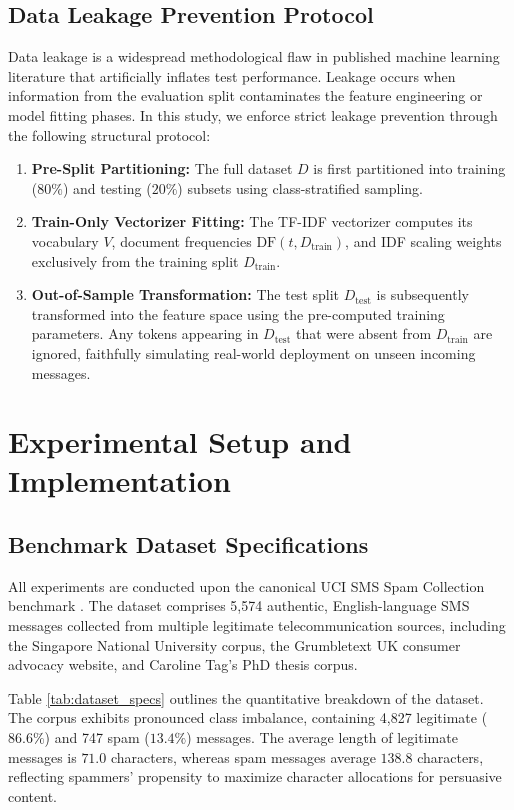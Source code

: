 \documentclass[conference]{IEEEtran}
\begin{document}
\subsection{Data Leakage Prevention Protocol}
Data leakage is a widespread methodological flaw in published machine learning literature that artificially inflates test performance. Leakage occurs when information from the evaluation split contaminates the feature engineering or model fitting phases. In this study, we enforce strict leakage prevention through the following structural protocol:
\begin{enumerate}
    \item \textbf{Pre-Split Partitioning:} The full dataset $D$ is first partitioned into training ($80\%$) and testing ($20\%$) subsets using class-stratified sampling.
    \item \textbf{Train-Only Vectorizer Fitting:} The TF-IDF vectorizer computes its vocabulary $V$, document frequencies $\text{DF}(t, D_{\text{train}})$, and IDF scaling weights exclusively from the training split $D_{\text{train}}$.
    \item \textbf{Out-of-Sample Transformation:} The test split $D_{\text{test}}$ is subsequently transformed into the feature space using the pre-computed training parameters. Any tokens appearing in $D_{\text{test}}$ that were absent from $D_{\text{train}}$ are ignored, faithfully simulating real-world deployment on unseen incoming messages.
\end{enumerate}

\section{Experimental Setup and Implementation}

\subsection{Benchmark Dataset Specifications}
All experiments are conducted upon the canonical UCI SMS Spam Collection benchmark \cite{almeida2011contributions}. The dataset comprises 5,574 authentic, English-language SMS messages collected from multiple legitimate telecommunication sources, including the Singapore National University corpus, the Grumbletext UK consumer advocacy website, and Caroline Tag's PhD thesis corpus.

Table \ref{tab:dataset_specs} outlines the quantitative breakdown of the dataset. The corpus exhibits pronounced class imbalance, containing 4,827 legitimate ($86.6\%$) and 747 spam ($13.4\%$) messages. The average length of legitimate messages is $71.0$ characters, whereas spam messages average $138.8$ characters, reflecting spammers' propensity to maximize character allocations for persuasive content.
\end{document}
